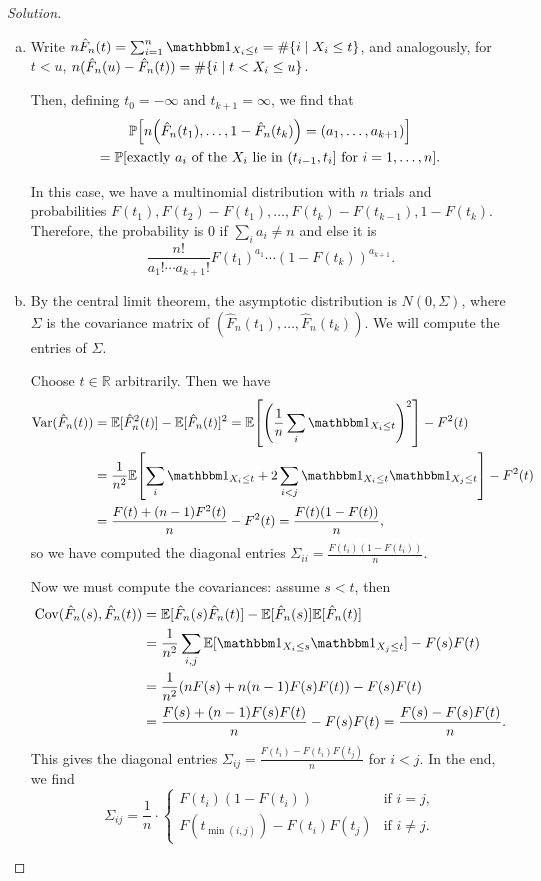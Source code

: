 \documentclass{article}
\theoremstyle{plain}
\theoremstyle{remark}
\newenvironment{solution}{\begin{proof}[Solution]\renewcommand\qedsymbol{}}{\end{proof}}
\newcommand{\Bb}{\mathbb}
\newcommand{\PP}{\Bb P}
\newcommand{\RR}{\Bb R}
\newcommand{\EE}{\Bb E}
\newcommand\ind{\mathbbm 1} %
\DeclareMathOperator{\Var}{Var}
\DeclareMathOperator\Cov{Cov}
\begin{document}
\begin{solution}
	\begin{enumerate}[(a)] \item
	Write $n \hat F_n(t) = \sum_{i=1}^n \ind_{X_i \leq t} = \# \qty{i \mid X_i \leq t}$, and analogously, for $t < u$, 
	$n (\hat F_n(u) - \hat F_n(t)) = \#\qty{i \mid t < X_i \leq u}$. 
	
	Then, defining $t_0 = -\infty$ and $t_{k+1} = \infty$,  we find that
	\begin{gather*}
	\PP\qty[ n \qty(\hat F_n(t_1), \dotsc, 1 - \hat F_n(t_k)) = (a_1, \dotsc, a_{k+1})] \\ = \PP[\text{exactly $a_i$ of the $X_i$ lie in $(t_{i-1}, t_i]$ for $i = 1, \dotsc, n$}].
	\end{gather*}

In this case, we have a multinomial distribution with $n$ trials and probabilities $F(t_1), F(t_2) - F(t_1), \dotsc, F(t_k) - F(t_{k-1}), 1 - F(t_k)$. Therefore, the probability is 0 if $\sum_i a_i \neq n$ and else it is
\[
\frac{n!}{a_1! \dotsb a_{k+1}!} F(t_1)^{a_1} \dotsb (1 - F(t_k))^{a_{k+1}}. 
\]

\item By the central limit theorem, the asymptotic distribution is $N(0, \Sigma)$, where $\Sigma$ is the covariance matrix of $(\hat F_n(t_1), \dotsc, \hat F_n(t_k))$. We will compute the entries of $\Sigma$. 

Choose $t \in \RR$ arbitrarily. Then we have
\begin{align*}
	\Var(\hat F_n(t)) &= \EE[\hat F_n^2(t)] - \EE[\hat F_n(t)]^2 = \EE\qty[\qty(\frac1n\sum_i \ind_{X_i \leq t})^2] - F^2(t) \\
	&= \frac1{n^2}\EE\qty[\sum_i \ind_{X_i \leq t} + 2\sum_{i < j} \ind_{X_i \leq t} \ind_{X_j \leq t}] - F^2(t) \\
	&= \frac{F(t) + (n-1) F^2(t)}{n} - F^2(t) = \frac{F(t)(1 - F(t))}{n},
\end{align*}
so we have computed the diagonal entries $\Sigma_{ii} = \frac{F(t_i)(1 - F(t_i))}{n}$. 

Now we must compute the covariances: assume $s < t$, then  
\begin{align*}
	\Cov(\hat F_n(s), \hat F_n(t)) &= \EE[\hat F_n(s) \hat F_n(t)] - \EE[\hat F_n(s)] \EE[\hat F_n(t)] \\
	&= \frac1{n^2} \sum_{i, j} \EE[\ind_{X_i \leq s} \ind_{X_j \leq t}] - F(s)F(t) \\
	&= \frac1{n^2} \qty(n F(s) + n(n-1) F(s)F(t)) - F(s)F(t) \\
	&= \frac{F(s) + (n-1) F(s) F(t)}{n} - F(s)F(t) = \frac{F(s) - F(s)F(t)}{n}. 
\end{align*}
This gives the diagonal entries $\Sigma_{ij} = \frac{F(t_i) - F(t_i)F(t_j)}{n}$ for $i < j$. 
In the end, we find
\[
\Sigma_{ij} = \frac1n \cdot \begin{cases}
	F(t_i)(1 - F(t_i)) &\text{if $i = j$}, \\
	F(t_{\min(i, j)}) - F(t_i) F(t_j) &\text{if $i \neq j$}. 
\end{cases}
\]
\end{enumerate} 
\end{solution}
\end{document}
